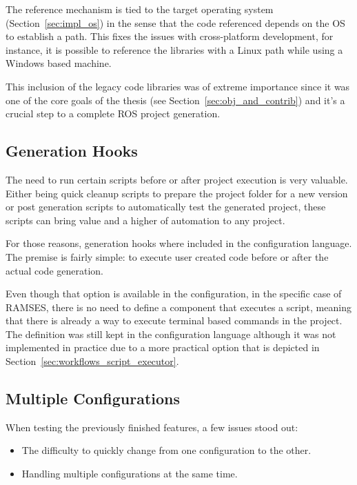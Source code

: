 The reference mechanism is tied to the target operating system (Section~\ref{sec:impl_os}) in the sense that the code referenced depends on the \gls{OS} to establish a path. This fixes the issues with cross-platform development, for instance, it is possible to reference the libraries with a Linux path while using a Windows based machine. 

This inclusion of the legacy code libraries was of extreme importance since it was one of the core goals of the thesis (see Section~\ref{sec:obj_and_contrib}) and it's a crucial step to a complete \gls{ROS} project generation.

\subsection{Generation Hooks}
\label{sec:impl_gen_hooks}

The need to run certain scripts before or after project execution is very valuable. Either being quick cleanup scripts to prepare the project folder for a new version or post generation scripts to automatically test the generated project, these scripts can bring value and a higher of automation to any project.

For those reasons, generation hooks where included in the configuration language. The premise is fairly simple: to execute user created code before or after the actual code generation.

Even though that option is available in the configuration, in the specific case of \gls{RAMSES}, there is no need to define a component that executes a script, meaning that there is already a way to execute terminal based commands in the project. The definition was still kept in the configuration language although it was not implemented in practice due to a more practical option that is depicted in Section~\ref{sec:workflows_script_executor}.


\subsection{Multiple Configurations}
\label{sec:impl_multi_config}

When testing the previously finished features, a few issues stood out: 

\begin{itemize} 
	\item The difficulty to quickly change from one configuration to the other.
	\item Handling multiple configurations at the same time.
\end{itemize}

